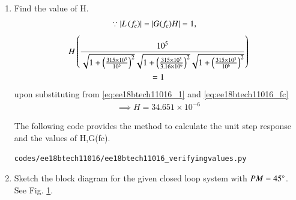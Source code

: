 \begin{enumerate}[label=\arabic*.,ref=\theenumi]
\item Find the value of H.\\
\solution 
\begin{align}
\because \left\vert L\left(f_c\right)\right\vert = \left\vert G(f_{c})H\right\vert &= 1,
\end{align}
{\small 
\begin{multline}
H\left(\frac{10^5}{\sqrt{1+\left(\frac{315\times10^3}{10^5}\right)^2}\sqrt{1+\left(\frac{315\times10^3}{3.16\times10^6}\right)^2}\sqrt{1+\left(\frac{315\times10^3}{10^6}\right)^2}}\right) 
\\
=1
\end{multline}
}
upon substituting from \eqref{eq:ee18btech11016_1}
and \eqref{eq:ee18btech11016_fc}
%
\begin{align}
\implies  H = 34.651\times10^{-6}
\end{align}

The following code provides the method to calculate the unit step response and the values of H,G(fc).
\begin{lstlisting}
codes/ee18btech11016/ee18btech11016_verifyingvalues.py
\end{lstlisting}
%
%
\item Sketch the block diagram for the given closed loop  system with $PM = 45 \degree$. \\
\solution See Fig. 	\ref{fig:ee18btech11016_figa}.

\begin{figure}[ht!]
	\begin{center}
		\resizebox{\columnwidth/1}{!}{}
	\end{center}
	\caption{}
	\label{fig:ee18btech11016_figa}
\end{figure}


\end{enumerate}
